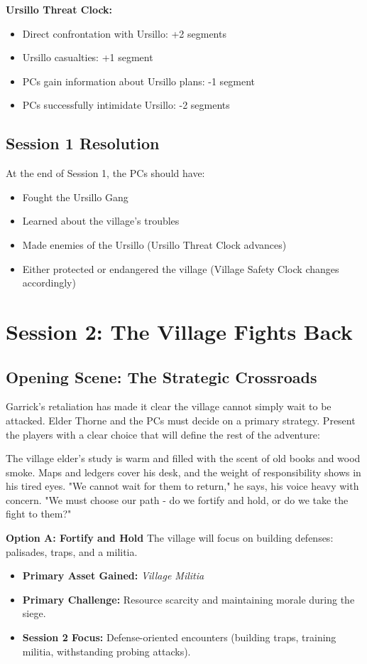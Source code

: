 \documentclass[11pt]{article}
\begin{document}
\textbf{Ursillo Threat Clock:}
\begin{itemize}
\item Direct confrontation with Ursillo: +2 segments
\item Ursillo casualties: +1 segment
\item PCs gain information about Ursillo plans: -1 segment
\item PCs successfully intimidate Ursillo: -2 segments
\end{itemize}

\subsection{Session 1 Resolution}

At the end of Session 1, the PCs should have:
\begin{itemize}
\item Fought the Ursillo Gang
\item Learned about the village's troubles
\item Made enemies of the Ursillo (Ursillo Threat Clock advances)
\item Either protected or endangered the village (Village Safety Clock changes accordingly)
\end{itemize}

\section{Session 2: The Village Fights Back}

\subsection{Opening Scene: The Strategic Crossroads}

Garrick's retaliation has made it clear the village cannot simply wait to be attacked. Elder Thorne and the PCs must decide on a primary strategy. Present the players with a clear choice that will define the rest of the adventure:

The village elder's study is warm and filled with the scent of old books and wood smoke. Maps and ledgers cover his desk, and the weight of responsibility shows in his tired eyes. "We cannot wait for them to return," he says, his voice heavy with concern. "We must choose our path - do we fortify and hold, or do we take the fight to them?"

\textbf{Option A: Fortify and Hold}
The village will focus on building defenses: palisades, traps, and a militia.
\begin{itemize}
\item \textbf{Primary Asset Gained:} \textit{Village Militia}
\item \textbf{Primary Challenge:} Resource scarcity and maintaining morale during the siege.
\item \textbf{Session 2 Focus:} Defense-oriented encounters (building traps, training militia, withstanding probing attacks).
\end{itemize}
\end{document}
